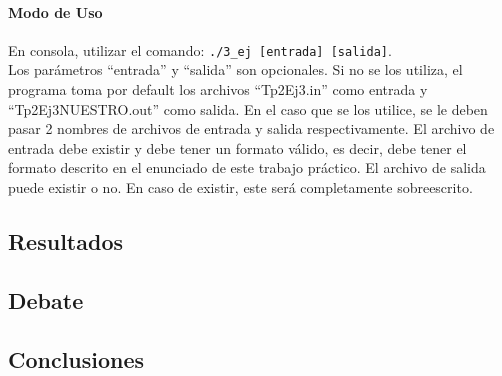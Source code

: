 \paragraph{Modo de Uso}
En consola, utilizar el comando: \texttt{./3\_ej [entrada] [salida]}.\\
Los parámetros ``entrada'' y ``salida'' son opcionales. Si no se los utiliza, el programa toma por default los archivos ``Tp2Ej3.in'' como entrada y ``Tp2Ej3NUESTRO.out'' como salida. En el caso que se los utilice, se le deben pasar 2 nombres de archivos de entrada y salida respectivamente. El archivo de entrada debe existir y debe tener un formato válido, es decir, debe tener el formato descrito en el enunciado de este trabajo práctico. El archivo de salida puede existir o no. En caso de existir, este será completamente sobreescrito.


\subsection{Resultados}
\subsection{Debate}
\subsection{Conclusiones}
